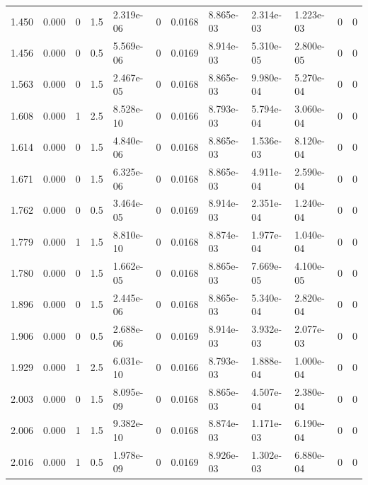 \documentclass[preview]{standalone}
\begin{document}
{{\begin{tabular}{L{1.2cm}C{1.2cm} C{0.3cm}C{0.5cm} C{1.4cm}C{1.4cm} C{1.4cm}C{1.4cm} C{1.6cm}C{1.6cm} C{1.6cm}C{1.6cm}}
  1.450  &  0.000  & 0     & 1.5 &  2.319e-06  & 0  &  0.0168&   8.865e-03& 2.314e-03 & 1.223e-03   &  0 & 0  \\ 
  1.456  &  0.000  & 0     & 0.5 &  5.569e-06  & 0  &  0.0169&   8.914e-03& 5.310e-05 & 2.800e-05   &  0 & 0  \\ 
  1.563  &  0.000  & 0     & 1.5 &  2.467e-05  & 0  &  0.0168&   8.865e-03& 9.980e-04 & 5.270e-04   &  0 & 0  \\ 
  1.608  &  0.000  & 1     & 2.5 &  8.528e-10  & 0  &  0.0166&   8.793e-03& 5.794e-04 & 3.060e-04   &  0 & 0  \\ 
  1.614  &  0.000  & 0     & 1.5 &  4.840e-06  & 0  &  0.0168&   8.865e-03& 1.536e-03 & 8.120e-04   &  0 & 0  \\ 
  1.671  &  0.000  & 0     & 1.5 &  6.325e-06  & 0  &  0.0168&   8.865e-03& 4.911e-04 & 2.590e-04   &  0 & 0  \\ 
  1.762  &  0.000  & 0     & 0.5 &  3.464e-05  & 0  &  0.0169&   8.914e-03& 2.351e-04 & 1.240e-04   &  0 & 0  \\ 
  1.779  &  0.000  & 1     & 1.5 &  8.810e-10  & 0  &  0.0168&   8.874e-03& 1.977e-04 & 1.040e-04   &  0 & 0  \\ 
  1.780  &  0.000  & 0     & 1.5 &  1.662e-05  & 0  &  0.0168&   8.865e-03& 7.669e-05 & 4.100e-05   &  0 & 0  \\ 
  1.896  &  0.000  & 0     & 1.5 &  2.445e-06  & 0  &  0.0168&   8.865e-03& 5.340e-04 & 2.820e-04   &  0 & 0  \\ 
  1.906  &  0.000  & 0     & 0.5 &  2.688e-06  & 0  &  0.0169&   8.914e-03& 3.932e-03 & 2.077e-03   &  0 & 0  \\ 
  1.929  &  0.000  & 1     & 2.5 &  6.031e-10  & 0  &  0.0166&   8.793e-03& 1.888e-04 & 1.000e-04   &  0 & 0  \\ 
  2.003  &  0.000  & 0     & 1.5 &  8.095e-09  & 0  &  0.0168&   8.865e-03& 4.507e-04 & 2.380e-04   &  0 & 0  \\ 
  2.006  &  0.000  & 1     & 1.5 &  9.382e-10  & 0  &  0.0168&   8.874e-03& 1.171e-03 & 6.190e-04   &  0 & 0  \\ 
  2.016  &  0.000  & 1     & 0.5 &  1.978e-09  & 0  &  0.0169&   8.926e-03& 1.302e-03 & 6.880e-04   &  0 & 0  \\ 
\hline 
\end{tabular} 

}}
\end{document}
